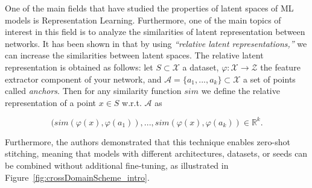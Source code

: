 \documentclass[../main.tex]{subfiles}
\begin{document}
\begin{sloppypar}
One of the main fields that have studied the properties of latent spaces of ML models is Representation Learning. Furthermore, one of the main topics of interest in this field is to analyze the similarities of latent representation between networks. It has been shown in \cite{moschella_relative_2022} that by using \emph{``relative latent representations,''} we can increase the similarities between latent spaces. The relative latent representation is obtained as follows: let $S\subset\mathcal{X}$ a dataset, $\varphi: \mathcal{X} \to \mathcal{Z}$ the feature extractor component of your network, and ${\mathcal{A}=\{a_1, ..., a_k\}\subset\mathcal{X}}$ a set of points called \emph{anchors}. Then for any similarity function $sim$ we define the relative representation of a point $x\in S$  w.r.t. $\mathcal{A}$ as    
\end{sloppypar}

\[
(sim(\varphi(x), \varphi(a_1)), ..., sim(\varphi(x), \varphi(a_k))\in \mathbb{R}^k.
\]

Furthermore, the authors demonstrated that this technique enables zero-shot stitching, meaning that models with different architectures, datasets, or seeds can be combined without additional fine-tuning, as illustrated in Figure~\ref{fig:crossDomainScheme_intro}.\\
\end{document}
